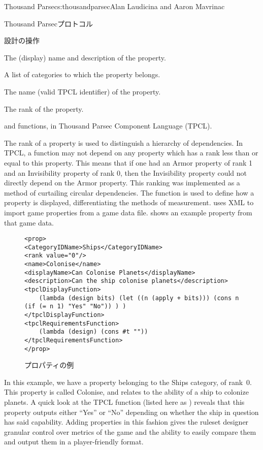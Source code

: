 \begin{aosachapter}{Thousand Parsec}{s:thousandparsec}{Alan Laudicina and Aaron Mavrinac}
\begin{aosasect1}{Thousand Parsecプロトコル}
\begin{aosasect2}{設計の操作}
\begin{aosaitemize}

  \item The (display) name and description of the property.

  \item A list of categories to which the property belongs.

  \item The name (valid TPCL identifier) of the property.

  \item The rank of the property.

  \item {} and  functions, in Thousand Parsec Component Language (TPCL).

\end{aosaitemize}

The rank of a property is used to distinguish a hierarchy of
dependencies. In TPCL, a function may not depend on any property which
has a rank less than or equal to this property. This means that if one
had an Armor property of rank 1 and an Invisibility property of rank
0, then the Invisibility property could not directly depend on the
Armor property. This ranking was implemented as a method of curtailing
circular dependencies. The  function is used to define
how a property is displayed, differentiating the methods of
measurement.  uses XML to import game
properties from a game data file.  shows an
example property from that game data.

\begin{figure}
\begin{verbatim}
<prop>
<CategoryIDName>Ships</CategoryIDName>
<rank value="0"/>
<name>Colonise</name>
<displayName>Can Colonise Planets</displayName>
<description>Can the ship colonise planets</description>
<tpclDisplayFunction>
    (lambda (design bits) (let ((n (apply + bits))) (cons n (if (= n 1) "Yes" "No")) ) )
</tpclDisplayFunction>
<tpclRequirementsFunction>
    (lambda (design) (cons #t ""))
</tpclRequirementsFunction>
</prop>
\end{verbatim}
\caption{プロパティの例}
\label{fig.tp.prop}
\end{figure}

In this example, we have a property belonging to the Ships category,
of rank~0. This property is called Colonise, and relates to the
ability of a ship to colonize planets. A quick look at the TPCL
 function (listed here as )
reveals that this property outputs either ``Yes'' or ``No'' depending
on whether the ship in question has said capability. Adding properties
in this fashion gives the ruleset designer granular control over
metrics of the game and the ability to easily compare them and output
them in a player-friendly format.


\end{aosasect2}
\end{aosasect1}
\end{aosachapter}
